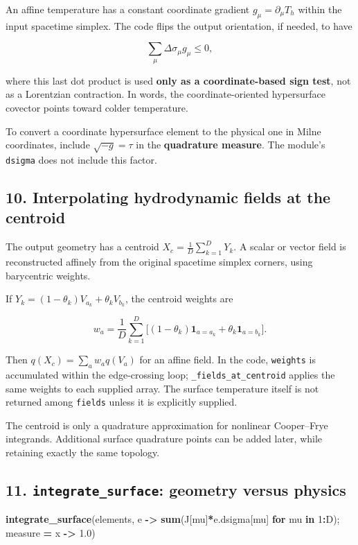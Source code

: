 \documentclass[
  10pt,
]{article}
\newenvironment{Shaded}{\begin{snugshade}}{\end{snugshade}}
\newcommand{\ConstantTok}[1]{\textcolor[rgb]{0.56,0.35,0.01}{#1}}
\newcommand{\ControlFlowTok}[1]{\textcolor[rgb]{0.13,0.29,0.53}{\textbf{#1}}}
\newcommand{\FloatTok}[1]{\textcolor[rgb]{0.00,0.00,0.81}{#1}}
\newcommand{\FunctionTok}[1]{\textcolor[rgb]{0.13,0.29,0.53}{\textbf{#1}}}
\newcommand{\KeywordTok}[1]{\textcolor[rgb]{0.13,0.29,0.53}{\textbf{#1}}}
\newcommand{\NormalTok}[1]{#1}
\newcommand{\OperatorTok}[1]{\textcolor[rgb]{0.81,0.36,0.00}{\textbf{#1}}}
\begin{document}
An affine temperature has a constant coordinate gradient
\(g_\mu=\partial_\mu T_h\) within the input spacetime simplex. The code
flips the output orientation, if needed, to have

\[
\sum_\mu\Delta\sigma_\mu g_\mu\le0,
\]

where this last dot product is used \textbf{only as a coordinate-based
sign test}, not as a Lorentzian contraction. In words, the
coordinate-oriented hypersurface covector points toward colder
temperature.

To convert a coordinate hypersurface element to the physical one in
Milne coordinates, include \(\sqrt{-g}=\tau\) in the \textbf{quadrature
measure}. The module's \texttt{dsigma} does not include this factor.

\subsection{10. Interpolating hydrodynamic fields at the
centroid}\label{interpolating-hydrodynamic-fields-at-the-centroid}

The output geometry has a centroid \(X_c=\frac1D\sum_{k=1}^{D}Y_k\). A
scalar or vector field is reconstructed affinely from the original
spacetime simplex corners, using barycentric weights.

If \(Y_k=(1-\theta_k)V_{a_k}+\theta_kV_{b_k}\), the centroid weights are

\[
w_a=\frac1D\sum_{k=1}^D\big[(1-\theta_k)\mathbf1_{a=a_k}
+\theta_k\mathbf1_{a=b_k}\big].
\]

Then \(q(X_c)=\sum_a w_a q(V_a)\) for an affine field. In the code,
\texttt{weights} is accumulated within the edge-crossing loop;
\texttt{\_fields\_at\_centroid} applies the same weights to each
supplied array. The surface temperature itself is not returned among
\texttt{fields} unless it is explicitly supplied.

The centroid is only a quadrature approximation for nonlinear
Cooper--Frye integrands. Additional surface quadrature points can be
added later, while retaining exactly the same topology.

\subsection{\texorpdfstring{11. \texttt{integrate\_surface}: geometry
versus
physics}{11. integrate\_surface: geometry versus physics}}\label{integrate_surface-geometry-versus-physics}

\begin{Shaded}
\begin{Highlighting}[]
\FunctionTok{integrate\_surface}\NormalTok{(elements,}
    \ConstantTok{e} \OperatorTok{{-}\textgreater{}} \FunctionTok{sum}\NormalTok{(J[mu]}\OperatorTok{*}\ConstantTok{e}\NormalTok{.dsigma[mu] }\ControlFlowTok{for}\NormalTok{ mu }\KeywordTok{in} \FloatTok{1}\OperatorTok{:}\NormalTok{D);}
\NormalTok{    measure }\OperatorTok{=}\NormalTok{ x }\OperatorTok{{-}\textgreater{}} \FloatTok{1.0}\NormalTok{)}
\end{Highlighting}
\end{Shaded}
\end{document}
